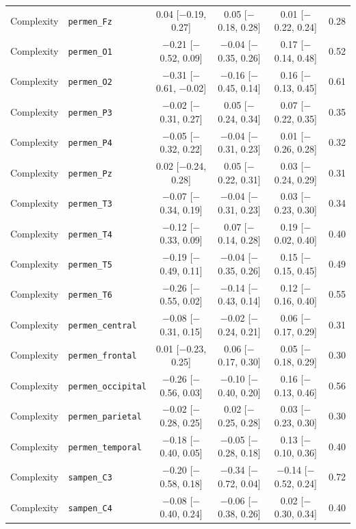 {\begin{longtable}{llcccc}
Complexity & \texttt{permen\_Fz} & 0.04 [$-$0.19, 0.27] & 0.05 [$-$0.18, 0.28] & 0.01 [$-$0.22, 0.24] & 0.28 \\
Complexity & \texttt{permen\_O1} & $-$0.21 [$-$0.52, 0.09] & $-$0.04 [$-$0.35, 0.26] & 0.17 [$-$0.14, 0.48] & 0.52 \\
Complexity & \texttt{permen\_O2} & $-$0.31 [$-$0.61, $-$0.02] & $-$0.16 [$-$0.45, 0.14] & 0.16 [$-$0.13, 0.45] & 0.61 \\
Complexity & \texttt{permen\_P3} & $-$0.02 [$-$0.31, 0.27] & 0.05 [$-$0.24, 0.34] & 0.07 [$-$0.22, 0.35] & 0.35 \\
Complexity & \texttt{permen\_P4} & $-$0.05 [$-$0.32, 0.22] & $-$0.04 [$-$0.31, 0.23] & 0.01 [$-$0.26, 0.28] & 0.32 \\
Complexity & \texttt{permen\_Pz} & 0.02 [$-$0.24, 0.28] & 0.05 [$-$0.22, 0.31] & 0.03 [$-$0.24, 0.29] & 0.31 \\
Complexity & \texttt{permen\_T3} & $-$0.07 [$-$0.34, 0.19] & $-$0.04 [$-$0.31, 0.23] & 0.03 [$-$0.23, 0.30] & 0.34 \\
Complexity & \texttt{permen\_T4} & $-$0.12 [$-$0.33, 0.09] & 0.07 [$-$0.14, 0.28] & 0.19 [$-$0.02, 0.40] & 0.40 \\
Complexity & \texttt{permen\_T5} & $-$0.19 [$-$0.49, 0.11] & $-$0.04 [$-$0.35, 0.26] & 0.15 [$-$0.15, 0.45] & 0.49 \\
Complexity & \texttt{permen\_T6} & $-$0.26 [$-$0.55, 0.02] & $-$0.14 [$-$0.43, 0.14] & 0.12 [$-$0.16, 0.40] & 0.55 \\
Complexity & \texttt{permen\_central} & $-$0.08 [$-$0.31, 0.15] & $-$0.02 [$-$0.24, 0.21] & 0.06 [$-$0.17, 0.29] & 0.31 \\
Complexity & \texttt{permen\_frontal} & 0.01 [$-$0.23, 0.25] & 0.06 [$-$0.17, 0.30] & 0.05 [$-$0.18, 0.29] & 0.30 \\
Complexity & \texttt{permen\_occipital} & $-$0.26 [$-$0.56, 0.03] & $-$0.10 [$-$0.40, 0.20] & 0.16 [$-$0.13, 0.46] & 0.56 \\
Complexity & \texttt{permen\_parietal} & $-$0.02 [$-$0.28, 0.25] & 0.02 [$-$0.25, 0.28] & 0.03 [$-$0.23, 0.30] & 0.30 \\
Complexity & \texttt{permen\_temporal} & $-$0.18 [$-$0.40, 0.05] & $-$0.05 [$-$0.28, 0.18] & 0.13 [$-$0.10, 0.36] & 0.40 \\
Complexity & \texttt{sampen\_C3} & $-$0.20 [$-$0.58, 0.18] & $-$0.34 [$-$0.72, 0.04] & $-$0.14 [$-$0.52, 0.24] & 0.72 \\
Complexity & \texttt{sampen\_C4} & $-$0.08 [$-$0.40, 0.24] & $-$0.06 [$-$0.38, 0.26] & 0.02 [$-$0.30, 0.34] & 0.40 \\

\end{longtable}}
